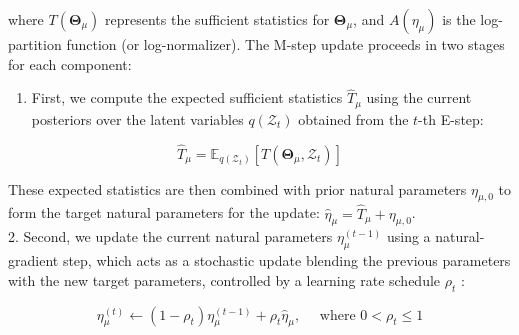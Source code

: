 \documentclass[10pt]{article}
\begin{document}
where $T\left(\boldsymbol{\Theta}_{\mu}\right)$ represents the sufficient statistics for $\boldsymbol{\Theta}_{\mu}$, and $A\left(\eta_{\mu}\right)$ is the log-partition function (or log-normalizer). The M-step update proceeds in two stages for each component:

\begin{enumerate}
  \item First, we compute the expected sufficient statistics $\widehat{T}_{\mu}$ using the current posteriors over the latent variables $q\left(\mathcal{Z}_{t}\right)$ obtained from the $t$-th E-step:
\end{enumerate}


\begin{equation*}
\widehat{T}_{\mu}=\mathbb{E}_{q\left(\mathcal{Z}_{t}\right)}\left[T\left(\boldsymbol{\Theta}_{\mu}, \mathcal{Z}_{t}\right)\right] \tag{38}
\end{equation*}


These expected statistics are then combined with prior natural parameters $\eta_{\mu, 0}$ to form the target natural parameters for the update: $\widehat{\eta}_{\mu}=\widehat{T}_{\mu}+\eta_{\mu, 0}$.\\
2. Second, we update the current natural parameters $\eta_{\mu}^{(t-1)}$ using a natural-gradient step, which acts as a stochastic update blending the previous parameters with the new target parameters, controlled by a learning rate schedule $\rho_{t}$ :


\begin{equation*}
\eta_{\mu}^{(t)} \leftarrow\left(1-\rho_{t}\right) \eta_{\mu}^{(t-1)}+\rho_{t} \widehat{\eta}_{\mu}, \quad \text { where } 0<\rho_{t} \leq 1 \tag{39}
\end{equation*}
\end{document}
